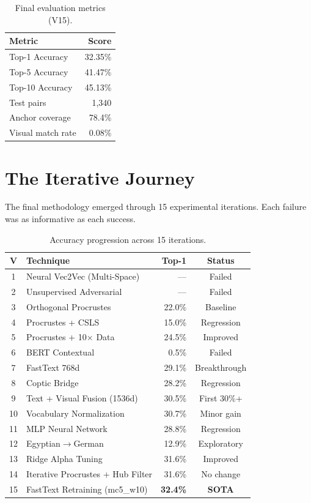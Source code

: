 \documentclass[11pt, a4paper]{article}
\begin{document}
\begin{table}[H]
\centering
\begin{tabular}{lr}
\toprule
Metric & Score \\
\midrule
Top-1 Accuracy & 32.35\% \\
Top-5 Accuracy & 41.47\% \\
Top-10 Accuracy & 45.13\% \\
\midrule
Test pairs & 1,340 \\
Anchor coverage & 78.4\% \\
Visual match rate & 0.08\% \\
\bottomrule
\end{tabular}
\caption{Final evaluation metrics (V15).}
\label{tab:final_results}
\end{table}

\section{The Iterative Journey}
\label{sec:journey}

The final methodology emerged through 15 experimental iterations. Each failure was as informative as each success.

\begin{table}[H]
\centering
\small
\begin{tabular}{clrc}
\toprule
V & Technique & Top-1 & Status \\
\midrule
1 & Neural Vec2Vec (Multi-Space) & --- & Failed \\
2 & Unsupervised Adversarial & --- & Failed \\
3 & Orthogonal Procrustes & 22.0\% & Baseline \\
4 & Procrustes + CSLS & 15.0\% & Regression \\
5 & Procrustes + 10$\times$ Data & 24.5\% & Improved \\
6 & BERT Contextual & 0.5\% & Failed \\
7 & FastText 768d & 29.1\% & Breakthrough \\
8 & Coptic Bridge & 28.2\% & Regression \\
9 & Text + Visual Fusion (1536d) & 30.5\% & First 30\%+ \\
10 & Vocabulary Normalization & 30.7\% & Minor gain \\
11 & MLP Neural Network & 28.8\% & Regression \\
12 & Egyptian$\to$German & 12.9\% & Exploratory \\
13 & Ridge Alpha Tuning & 31.6\% & Improved \\
14 & Iterative Procrustes + Hub Filter & 31.6\% & No change \\
15 & FastText Retraining (mc5\_w10) & \textbf{32.4\%} & \textbf{SOTA} \\
\bottomrule
\end{tabular}
\caption{Accuracy progression across 15 iterations.}
\label{tab:progression}
\end{table}
\end{document}

